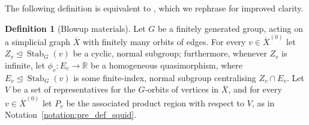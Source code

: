 \documentclass[svgnames]{amsart}
\theoremstyle{plain}
\theoremstyle{definition}
\newtheorem{defn}[thm]{Definition}
\newcommand{\R}{\mathbb{R}}
\newcommand{\ov}[1]{\overline{#1}}
\newcommand{\Stab}[2]{\operatorname{Stab}_{#1}(#2)}
\begin{document}
The following definition is equivalent to \cite[Definition 3.9]{Short_HHG:I}, which we rephrase for improved clarity.
\begin{defn}[Blowup materials]\label{defn:squid_material}
Let $G$ be a finitely generated group, acting on a simplicial graph $\ov X$ with finitely many orbits of edges. For every $v\in \ov X^{(0)}$ let $Z_v\unlhd \Stab{G}{v}$ be a cyclic, normal subgroup; furthermore, whenever $Z_v$ is infinite, let $\phi_v\colon E_v\to \R$ be a homogeneous quasimorphism, where $E_v\unlhd \Stab{G}{v}$ is some finite-index, normal subgroup centralising $Z_v\cap E_v$. Let $V$ be a set of representatives for the $G$-orbits of vertices in $\ov X$, and for every $v\in \ov X^{(0)}$ let $P_v$ be the associated product region with respect to $V$, as in Notation~\ref{notation:pre_def_squid}.  


\end{defn}
\end{document}
